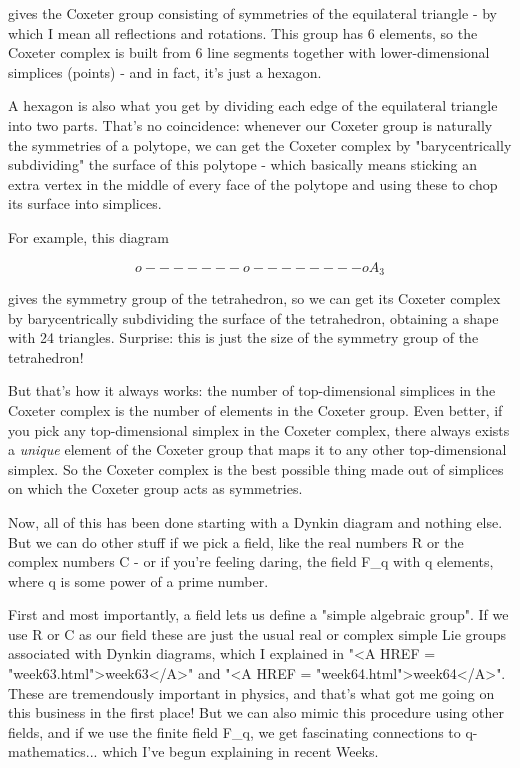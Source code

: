 gives the Coxeter group consisting of symmetries of the equilateral
triangle - by which I mean all reflections and rotations.  This group
has 6 elements, so the Coxeter complex is built from 6 line segments
together with lower-dimensional simplices (points) - and in fact, it's 
just a hexagon.    

A hexagon is also what you get by dividing each edge of the equilateral
triangle into two parts.  That's no coincidence: whenever our Coxeter
group is naturally the symmetries of a polytope, we can get the Coxeter
complex by "barycentrically subdividing" the surface of this polytope -
which basically means sticking an extra vertex in the middle of every
face of the polytope and using these to chop its surface into simplices.

For example, this diagram


$$

                       o-------o--------o              A_{3}
$$
    
gives the symmetry group of the tetrahedron, so we can get its Coxeter
complex by barycentrically subdividing the surface of the tetrahedron,
obtaining a shape with 24 triangles.  Surprise: this is just the size
of the symmetry group of the tetrahedron!  

But that's how it always works: the number of top-dimensional simplices
in the Coxeter complex is the number of elements in the Coxeter group. 
Even better, if you pick any top-dimensional simplex in the Coxeter
complex, there always exists a \emph{unique} element of the Coxeter group
that maps it to any other top-dimensional simplex.   So the Coxeter
complex is the best possible thing made out of simplices on which the
Coxeter group acts as symmetries.

Now, all of this has been done starting with a Dynkin diagram and
nothing else.  But we can do other stuff if we pick a field, like the
real numbers R or the complex numbers C - or if you're feeling daring,
the field F_{q} with q elements, where q is some power of a prime number.

First and most importantly, a field lets us define a "simple algebraic
group".  If we use R or C as our field these are just the usual real
or complex simple Lie groups associated with Dynkin diagrams, which 
I explained in "<A HREF = "week63.html">week63</A>" and "<A HREF = "week64.html">week64</A>".  These are tremendously important 
in physics, and that's what got me going on this business in the first
place!   But we can also mimic this procedure using other fields, and 
if we use the finite field F_{q}, we get fascinating connections to 
q-mathematics... which I've begun explaining in recent Weeks.  

